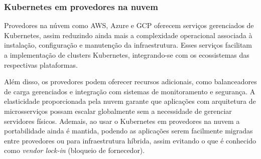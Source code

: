 






\subsubsection*{Kubernetes em provedores na nuvem}
Provedores na núvem como AWS, Azure e GCP oferecem serviços gerenciados de Kubernetes, assim reduzindo ainda mais a complexidade operacional associada à instalação, configuração e manutenção da infraestrutura. Esses serviços facilitam a implementação de clusters Kubernetes, integrando-se com os ecossistemas das respectivas plataformas.

Além disso, os provedores podem oferecer recursos adicionais, como balanceadores de carga gerenciados e integração com sistemas de monitoramento e segurança. A elasticidade proporcionada pela nuvem garante que aplicações com arquitetura de microsserviços possam escalar globalmente sem a necessidade de gerenciar servidores físicos. Ademais, ao usar o Kubernetes em provedores na nuvem a portabilidade ainda é mantida, podendo as aplicações serem facilmente migradas entre provedores ou para infraestrutura híbrida, assim evitando o que é conhecido como \emph{vendor lock-in} (bloqueio de fornecedor).


